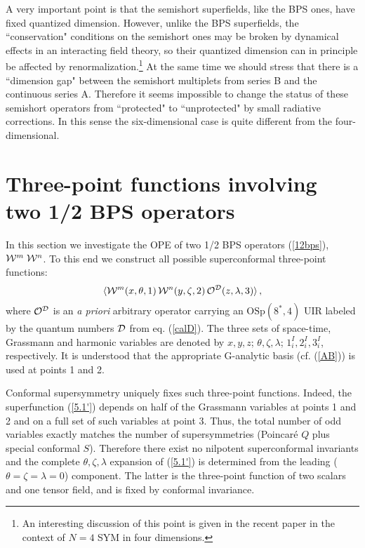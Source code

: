 \documentclass[a4paper,11pt]{article}
\begin{document}
A very important point is that the semishort superfields, like the
BPS ones, have fixed quantized dimension. However, unlike the BPS
superfields, the ``conservation" conditions on the semishort ones
may be broken by dynamical effects in an interacting field theory,
so their quantized dimension can in principle be affected by
renormalization.\footnote{An interesting discussion of this point
is given in the recent paper \cite{HH} in the context of $N=4$ SYM
in four dimensions.} At the same time we should stress that there
is a ``dimension gap" between the semishort multiplets from series
B and the continuous series A. Therefore it seems impossible to
change the status of these semishort operators from ``protected"
to ``unprotected" by small radiative corrections. In this sense
the six-dimensional case is quite different from the
four-dimensional.


\section{Three-point functions involving two 1/2 BPS operators}


In this section we investigate the OPE of two 1/2 BPS operators (\ref{12bps}),
${\cal W}^m\; {\cal W}^n$. To this end we construct all possible superconformal
three-point functions:
\begin{equation}\label{5.1'}
  \langle {\cal W}^m(x,\theta,1) \,
  {\cal W}^n(y,\zeta,2) \,
  {\cal O}^{{\cal D}}(z,\lambda,3) \rangle \, ,
\end{equation}
where ${\cal O}^{{\cal D}}$ is an {\it a priori} arbitrary
operator carrying an $\mbox{OSp}(8^{*},4)$ UIR labeled by the
quantum numbers ${\cal D}$ from eq. (\ref{calD}).  The three sets
of space-time, Grassmann and harmonic variables are denoted by
$x,y,z$; $\theta,\zeta,\lambda$; $1^I_i,2^I_i,3^I_i$,
respectively. It is understood that the appropriate G-analytic
basis (cf. (\ref{AB})) is used at points 1 and 2.

Conformal supersymmetry uniquely fixes such three-point functions. Indeed, the
superfunction (\ref{5.1'}) depends on half of the Grassmann variables at points
1 and 2 and on a full set of such variables at point 3. Thus, the total number
of odd variables exactly matches the number of supersymmetries (Poincar\'e $Q$
plus special conformal $S$). Therefore there exist no nilpotent superconformal
invariants and the complete $\theta,\zeta,\lambda$ expansion of (\ref{5.1'}) is
determined from the leading ($\theta=\zeta=\lambda=0$) component. The latter is
the three-point function of two scalars and one tensor field, and is fixed by
conformal invariance.
\end{document}

